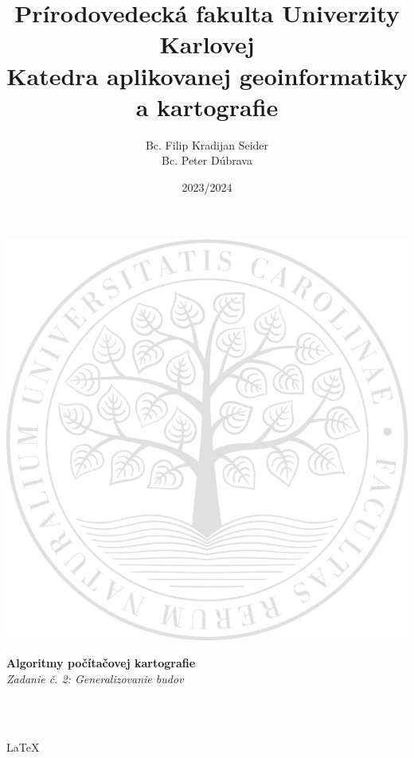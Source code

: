 \documentclass[12pt]{article}
\title{Prírodovedecká fakulta Univerzity Karlovej \\ 
\Large Katedra aplikovanej geoinformatiky a kartografie}
\date{}
\begin{document}
\maketitle
\vspace*{-2cm}
\begin{center}
\includegraphics[scale=0.4]{latex/image/logo.png} 
\end{center}

\begin{center}
\textbf {Algoritmy počítačovej kartografie}\\
\textit{Zadanie č. 2: Generalizovanie budov}\\
\vspace*{2cm}

\author {Bc. Filip Kradijan Seider\\Bc. Peter Dúbrava} \\
\date {2023/2024}
\\\LaTeX\
\end{center}
\thispagestyle{empty}
\newpage
\end{document}
